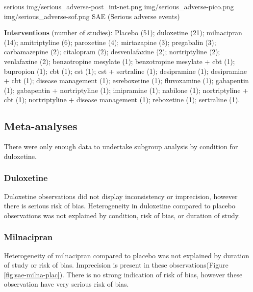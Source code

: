 \documentclass{report}\usepackage[]{graphicx}\usepackage[]{color}
\begin{document}
\soffignew
{serious}
{img/serious_adverse-post_int-net.png}
{img/serious_adverse-pico.png}
{img/serious_adverse-sof.png}
{SAE (Serious adverse events)}

\textbf{Interventions} (number of studies): Placebo (51); duloxetine (21); milnacipran (14); amitriptyline (6); paroxetine (4); mirtazapine (3); pregabalin (3); carbamazepine (2); citalopram (2); desvenlafaxine (2); nortriptyline (2); venlafaxine (2); benzotropine mesylate (1); benzotropine mesylate + cbt (1); bupropion (1); cbt (1); cst (1); cst + sertraline (1); desipramine (1); desipramine + cbt (1); disease management (1); esreboxetine (1); fluvoxamine (1); gabapentin (1); gabapentin + nortriptyline (1); imipramine (1); nabilone (1); nortriptyline + cbt (1); nortriptyline + disease management (1); reboxetine (1); sertraline (1).


\subsection{Meta-analyses}


There were only enough data to undertake subgroup analysis by condition for duloxetine.

\subsubsection{Duloxetine}

Duloxetine observations did not display inconsistency or imprecision, however there is serious risk of bias. Heterogeneity in duloxetine compared to placebo observations was not explained by condition, risk of bias, or duration of study.

\subsubsection{Milnacipran}

Heterogeneity of milnacipran compared to placebo was not explained by duration of study or risk of bias. Imprecision is present in these observations(Figure \ref{fig:sae-milna-plac}). There is no strong indication of risk of bias, however these observation have very serious risk of bias.
\end{document}
